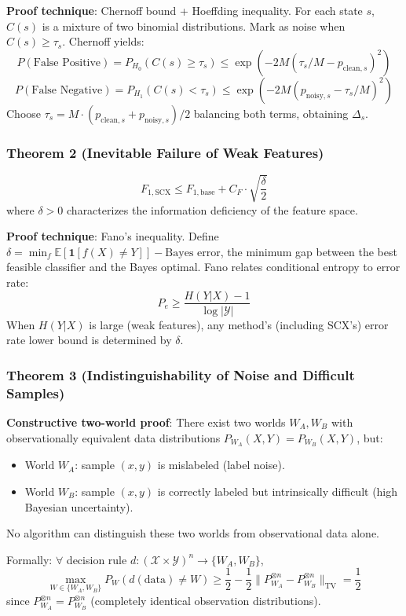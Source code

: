 \documentclass[
  12pt,
]{article}
\providecommand{\tightlist}{%
  \setlength{\itemsep}{0pt}\setlength{\parskip}{0pt}}
\begin{document}
\textbf{Proof technique}: Chernoff bound + Hoeffding inequality. For each state $s$, $C(s)$ is a mixture of two binomial distributions. Mark as noise when $C(s) \geq \tau_s$. Chernoff yields:
\[P(\text{False Positive}) = P_{H_0}(C(s) \geq \tau_s) \leq \exp(-2M(\tau_s/M - p_{\text{clean},s})^2)\]
\[P(\text{False Negative}) = P_{H_1}(C(s) < \tau_s) \leq \exp(-2M(p_{\text{noisy},s} - \tau_s/M)^2)\]
Choose $\tau_s = M \cdot (p_{\text{clean},s} + p_{\text{noisy},s})/2$ balancing both terms, obtaining $\Delta_s$.

\subsubsection{Theorem 2 (Inevitable Failure of Weak Features)}\label{theorem-2-weak-features}

\[\boxed{F_{1,\text{SCX}} \leq F_{1,\text{base}} + C_F \cdot \sqrt{\frac{\delta}{2}}}\]
where $\delta > 0$ characterizes the information deficiency of the feature space.

\textbf{Proof technique}: Fano's inequality. Define $\delta = \min_{f} \mathbb{E}[\mathbf{1}[f(X) \neq Y]] - \text{Bayes error}$, the minimum gap between the best feasible classifier and the Bayes optimal. Fano relates conditional entropy to error rate:
\[P_e \geq \frac{H(Y|X) - 1}{\log |\mathcal{Y}|}\]
When $H(Y|X)$ is large (weak features), any method's (including SCX's) error rate lower bound is determined by $\delta$.

\subsubsection{Theorem 3 (Indistinguishability of Noise and Difficult Samples)}\label{theorem-3-indistinguishability}

\textbf{Constructive two-world proof}: There exist two worlds $W_A, W_B$ with observationally equivalent data distributions $P_{W_A}(X, Y) = P_{W_B}(X, Y)$, but:
\begin{itemize}
\tightlist
\item
  World $W_A$: sample $(x, y)$ is mislabeled (label noise).
\item
  World $W_B$: sample $(x, y)$ is correctly labeled but intrinsically difficult (high Bayesian uncertainty).
\end{itemize}
No algorithm can distinguish these two worlds from observational data alone.

Formally: $\forall$ decision rule $d: (\mathcal{X} \times \mathcal{Y})^n \to \{W_A, W_B\}$,
\[\max_{W \in \{W_A, W_B\}} P_W(d(\text{data}) \neq W) \geq \frac{1}{2} - \frac{1}{2}\|P_{W_A}^{\otimes n} - P_{W_B}^{\otimes n}\|_{\text{TV}} = \frac{1}{2}\]
since $P_{W_A}^{\otimes n} = P_{W_B}^{\otimes n}$ (completely identical observation distributions).
\end{document}
